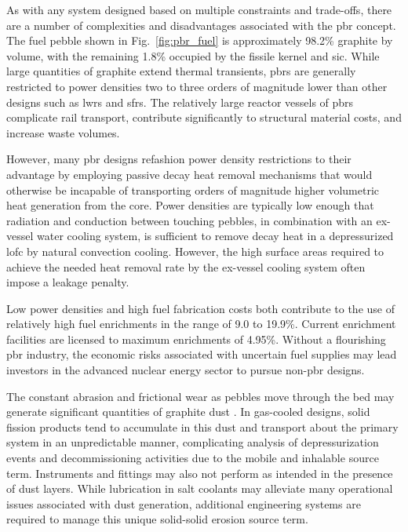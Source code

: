 As with any system designed based on multiple constraints and trade-offs, there are a number of complexities and disadvantages associated with the \gls{pbr} concept. The fuel pebble shown in Fig.\ \ref{fig:pbr_fuel} is approximately 98.2\% graphite by volume, with the remaining 1.8\% occupied by the fissile kernel and \gls{sic}. While large quantities of graphite extend thermal transients, \glspl{pbr} are generally restricted to power densities two to three orders of magnitude lower than other designs such as \glspl{lwr} and \glspl{sfr}. The relatively large reactor vessels of \glspl{pbr} complicate rail transport, contribute significantly to structural material costs, and increase waste volumes.

However, many \gls{pbr} designs refashion power density restrictions to their advantage by employing passive decay heat removal mechanisms that would otherwise be incapable of transporting orders of magnitude higher volumetric heat generation from the core. Power densities are typically low enough that radiation and conduction between touching pebbles, in combination with an ex-vessel water cooling system, is sufficient to remove decay heat in a depressurized \gls{lofc} by natural convection cooling. However, the high surface areas required to achieve the needed heat removal rate by the ex-vessel cooling system often impose a leakage penalty.

Low power densities and high fuel fabrication costs both contribute to the use of relatively high fuel enrichments in the range of 9.0 to 19.9\%. Current enrichment facilities are licensed to maximum enrichments of 4.95\%. Without a flourishing \gls{pbr} industry, the economic risks associated with uncertain fuel supplies may lead investors in the advanced nuclear energy sector to pursue non-\gls{pbr} designs. 

The constant abrasion and frictional wear as pebbles move through the bed may generate significant quantities of graphite dust \cite{hecker,moormann}. In gas-cooled designs, solid fission products tend to accumulate in this dust and transport about the primary system in an unpredictable manner, complicating analysis of depressurization events and decommissioning activities due to the mobile and inhalable source term. Instruments and fittings may also not perform as intended in the presence of dust layers. While lubrication in salt coolants may alleviate many operational issues associated with dust generation, additional engineering systems are required to manage this unique solid-solid erosion source term.

